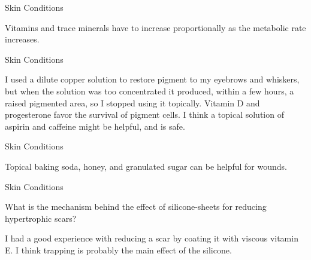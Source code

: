 \documentclass[11pt,oneside,openany,extrafontsizes]{memoir}
\begin{document}
\begin{standalonequote}{Skin Conditions}

    \begin{answer}
        Vitamins and trace minerals have to increase proportionally as the metabolic rate increases.
    \end{answer}
\end{standalonequote}

\begin{standalonequote}{Skin Conditions}

    \begin{answer}
        I used a dilute copper solution to restore pigment to my eyebrows and whiskers, but when the solution was too concentrated it produced, within a few hours, a raised pigmented area, so I stopped using it topically. Vitamin D and progesterone favor the survival of pigment cells. I think a topical solution of aspirin and caffeine might be helpful, and is safe.
    \end{answer}
\end{standalonequote}

\begin{standalonequote}{Skin Conditions}

    \begin{answer}
        Topical baking soda, honey, and granulated sugar can be helpful for wounds.
    \end{answer}
\end{standalonequote}

\begin{qaexchange}{Skin Conditions}

    \begin{question}
        What is the mechanism behind the effect of silicone-sheets for reducing hypertrophic scars?
    \end{question}

    \begin{answer}
        I had a good experience with reducing a scar by coating it with viscous vitamin E. I think trapping  is probably the main effect of the silicone.
    \end{answer}
\end{qaexchange}
\end{document}
